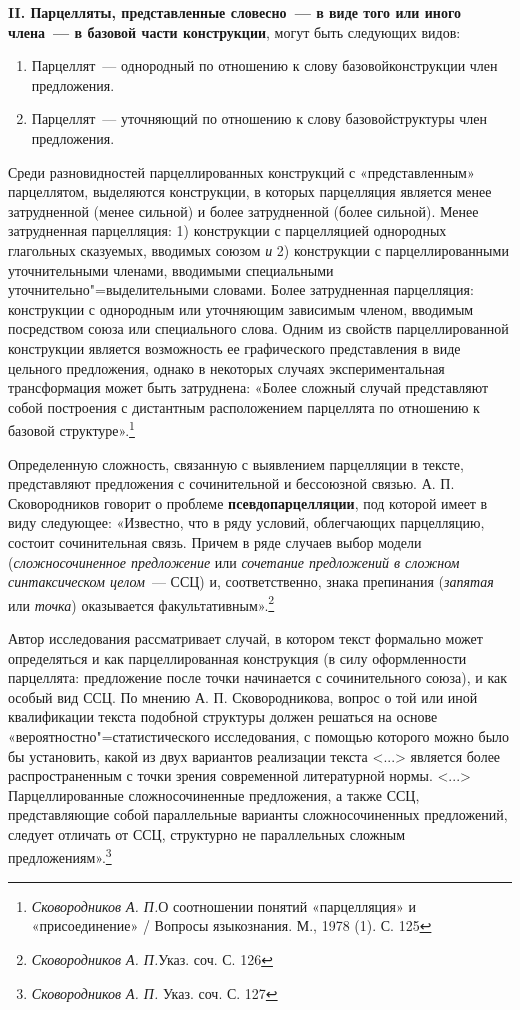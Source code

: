 \documentclass{kursa4}
\begin{document}
      \textbf{II. Парцелляты, представленные словесно~--- в виде того или иного члена~--- в базовой части конструкции}, могут быть следующих видов: \begin{enumerate}
        \item {Парцеллят~--- однородный по отношению к слову базовой}{конструкции член предложения.}
        \item {Парцеллят~--- уточняющий по отношению к слову базовой}{структуры член предложения.}
      \end{enumerate}

      Среди разновидностей парцеллированных конструкций с «представленным» парцеллятом, выделяются конструкции, в которых парцелляция является менее затрудненной (менее сильной) и более затрудненной (более сильной). Менее затрудненная парцелляция: 1) конструкции с парцелляцией однородных глагольных сказуемых, вводимых союзом \textit{и }2) конструкции с парцеллированными уточнительными членами, вводимыми специальными уточнительно"=выделительными словами. Более затрудненная парцелляция: конструкции с однородным или уточняющим зависимым членом, вводимым посредством союза или специального слова. Одним из свойств парцеллированной конструкции является возможность ее графического представления в виде цельного предложения, однако в некоторых случаях экспериментальная трансформация может быть затруднена: «Более сложный случай представляют собой построения с дистантным расположением парцеллята по отношению к базовой структуре».\footnote{\textit{{ Сковородников А. П.}}{О соотношении понятий «парцелляция» и «присоединение» / Вопросы языкознания. М., 1978 (1). С. 125}}

      Определенную сложность, связанную с выявлением парцелляции в тексте, представляют предложения с сочинительной и бессоюзной связью. А. П. Сковородников говорит о проблеме \textbf{псевдопарцелляции}, под которой имеет в виду следующее: «Известно, что в ряду условий, облегчающих парцелляцию, состоит сочинительная связь. Причем в ряде случаев выбор модели (\textit{сложносочиненное предложение} или \textit{сочетание предложений в сложном синтаксическом целом}{~--- ССЦ) и, соответственно, знака препинания (}\textit{запятая} или \textit{точка}) оказывается факультативным».\footnote{\textit{Сковородников А. П.}{Указ. соч. С. 126}}

      Автор исследования рассматривает случай, в котором текст формально может определяться и как парцеллированная конструкция (в силу оформленности парцеллята: предложение после точки начинается с сочинительного союза), и как особый вид ССЦ. По мнению А. П. Сковородникова, вопрос о той или иной квалификации текста подобной структуры должен решаться на основе «вероятностно"=статистического исследования, с помощью которого можно было бы установить, какой из двух вариантов реализации текста \textless{}...\textgreater{} является более распространенным с точки зрения современной литературной нормы. \textless{}...\textgreater{} Парцеллированные сложносочиненные предложения, а также ССЦ, представляющие собой параллельные варианты сложносочиненных предложений, следует отличать от
      {ССЦ, структурно не параллельных сложным предложениям}{».}\footnote{\textit{{ Сковородников А. П. }}{Указ. соч. С. 127}}{ }
\end{document}
